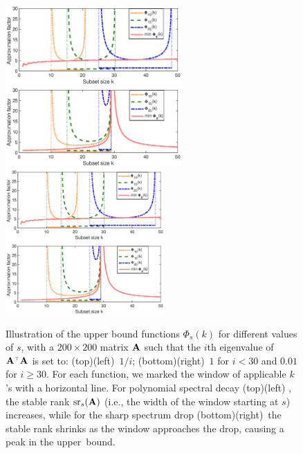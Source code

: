 \documentclass{article}
\begin{document}
\begin{figure}
  \centering
  \ifisarxiv
  \includegraphics[width=0.6\textwidth]{figs/nystrom/sliding}
\includegraphics[width=0.6\textwidth]{figs/nystrom/sliding-peak}
\else  
\hspace{-8mm}
\includegraphics[width=0.54\textwidth]{figs/nystrom/sliding}\hspace{-5mm}
\includegraphics[width=0.54\textwidth]{figs/nystrom/sliding-peak}
  \fi
  \caption{Illustration of the upper bound functions $\Phi_s(k)$ for
    different values of $s$, with a $200\times 200$ matrix $\mathbf A$ such
    that the $i$th eigenvalue of $\A^\top\A$ is set to:
    \ifisarxiv(top)\else(left)\fi\
    $1/i$;
    \ifisarxiv(bottom)\else(right)\fi\
    $1$ for $i<30$ and $0.01$ for $i\geq 30$. For each
    function, we marked the window of applicable $k$'s with a
    horizontal line. For polynomial spectral decay
    \ifisarxiv(top)\else(left)\fi
    , the stable rank
    ${\mathrm{sr}}_s(\mathbf A)$ (i.e., the width of the window starting at $s$)
    increases, while for the sharp spectrum drop
    \ifisarxiv(bottom)\else(right)\fi\
    the stable
    rank shrinks as the window approaches the drop, causing a peak in
    the upper~bound.}\vspace{-2mm}
  \label{f:sliding}
\end{figure}
\end{document}
